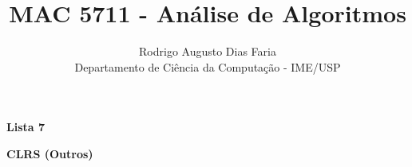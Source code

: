 \documentclass[12pt]{article}
\begin{document}
 
\title{MAC 5711 - Análise de Algoritmos}
\author{Rodrigo Augusto Dias Faria\\
Departamento de Ciência da Computação - IME/USP}
 
\maketitle

\begin{comment}
\begin{center} 
\textbf{\large{Lista 1}}
\end{center}




\clearpage
\begin{center} 
\textbf{\large{Lista 2}}
\end{center}



\clearpage
\begin{center} 
\textbf{\large{Lista 3}}
\end{center}





\clearpage

\begin{center} 
\textbf{\large{Lista 4}}
\end{center}






\clearpage

\begin{center} 
\textbf{\large{Lista 5}}
\end{center}


















\clearpage

\begin{center} 
\textbf{\large{Lista 6}}
\end{center}

















\clearpage
\end{comment}

\begin{center} 
\textbf{\large{Lista 7}}
\end{center}


\clearpage

\begin{center} 
\textbf{\large{CLRS (Outros)}}
\end{center}


\end{document}
